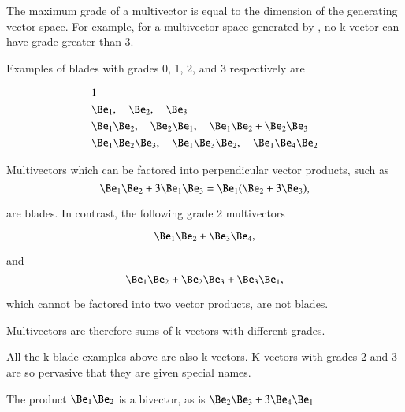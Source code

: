 The maximum grade of a multivector is equal to the dimension of the generating vector space.
For example, for a multivector space generated by , no k-vector can have grade greater than 3.

Examples of blades with grades 0, 1, 2, and 3 respectively are

\begin{dmath}\label{eqn:multivector:180}
\begin{aligned}
&1 \\
&\Be_1,\quad \Be_2,\quad \Be_3 \\
&\Be_1 \Be_2,\quad \Be_2 \Be_1,\quad \Be_1 \Be_2 + \Be_2 \Be_3 \\
&\Be_1 \Be_2 \Be_3,\quad \Be_1 \Be_3 \Be_2,\quad \Be_1 \Be_4 \Be_2
\end{aligned}
\end{dmath}

Multivectors which can be factored into perpendicular vector products, such as
\begin{dmath}\label{eqn:multiplication:220}
\Be_1 \Be_2 + 3 \Be_1 \Be_3
=
\Be_1 (\Be_2 + 3 \Be_3),
\end{dmath}

are blades.  In contrast, the following grade 2 multivectors

\begin{dmath}\label{eqn:multiplication:240}
\Be_1 \Be_2 + \Be_3 \Be_4,
\end{dmath}

and
\begin{dmath}\label{eqn:multiplication:260}
\Be_1 \Be_2 + \Be_2 \Be_3 + \Be_3 \Be_1,
\end{dmath}

which cannot be factored into two vector products, are not blades.


Multivectors are therefore sums of k-vectors with different grades.

All the k-blade examples above are also k-vectors.
K-vectors with grades 2 and 3 are so pervasive that they are given special names.


The product \( \Be_1 \Be_2 \) is a bivector, as is \( \Be_2 \Be_3 + 3 \Be_4 \Be_1 \)

